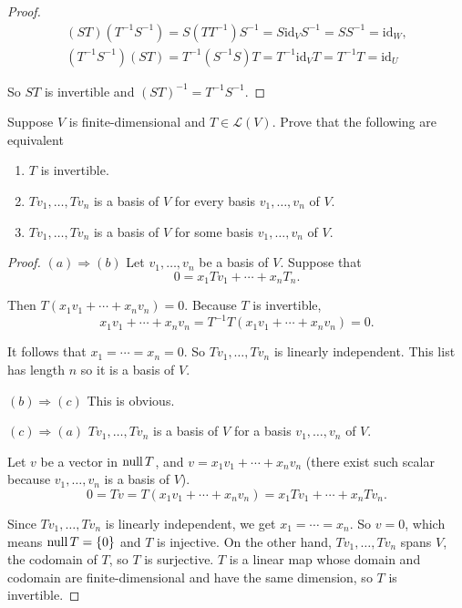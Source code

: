 \begin{proof}
    \[
        \begin{split}
            {(ST)}{(T^{-1}S^{-1})} = S(TT^{-1})S^{-1} = S\text{id}_{V}S^{-1} = SS^{-1} = \text{id}_{W}, \\
            {(T^{-1}S^{-1})(ST)} = T^{-1}(S^{-1}S)T = T^{-1}\text{id}_{V}T = T^{-1}T = \text{id}_{U}
        \end{split}
    \]

    So $ST$ is invertible and ${(ST)}^{-1} = T^{-1}S^{-1}$.
\end{proof}
\newpage

\begin{exercise}\label{chapter3:sectionD:exercise3}
    Suppose $V$ is finite-dimensional and $T \in \mathcal{L}(V)$. Prove that the following are equivalent
    \begin{enumerate}[label={(\alph*)}]
        \item $T$ is invertible.
        \item $Tv_{1}, \ldots, Tv_{n}$ is a basis of $V$ for every basis $v_{1}, \ldots, v_{n}$ of $V$.
        \item $Tv_{1}, \ldots, Tv_{n}$ is a basis of $V$ for some basis $v_{1}, \ldots, v_{n}$ of $V$.
    \end{enumerate}
\end{exercise}

\begin{proof}
    $(a) \Rightarrow (b)$ Let $v_{1}, \ldots, v_{n}$ be a basis of $V$. Suppose that
    \[
        0 = x_{1}Tv_{1} + \cdots + x_{n}T_{n}.
    \]

    Then $T(x_{1}v_{1} + \cdots + x_{n}v_{n}) = 0$. Because $T$ is invertible,
    \[
        x_{1}v_{1} + \cdots + x_{n}v_{n} = T^{-1}T(x_{1}v_{1} + \cdots + x_{n}v_{n}) = 0.
    \]

    It follows that $x_{1} = \cdots = x_{n} = 0$. So $Tv_{1}, \ldots, Tv_{n}$ is linearly independent. This list has length $n$ so it is a basis of $V$.

    $(b) \Rightarrow (c)$ This is obvious.

    $(c) \Rightarrow (a)$ $Tv_{1}, \ldots, Tv_{n}$ is a basis of $V$ for a basis $v_{1}, \ldots, v_{n}$ of $V$.

    Let $v$ be a vector in $\text{null}\,{T}$, and $v = x_{1}v_{1} + \cdots + x_{n}v_{n}$ (there exist such scalar because $v_{1}, \ldots, v_{n}$ is a basis of $V$).
    \[
        0 = Tv = T(x_{1}v_{1} + \cdots + x_{n}v_{n}) = x_{1}Tv_{1} + \cdots + x_{n}Tv_{n}.
    \]

    Since $Tv_{1}, \ldots, Tv_{n}$ is linearly independent, we get $x_{1} = \cdots = x_{n}$. So $v = 0$, which means $\text{null}\,{T} = \{0\}$ and $T$ is injective. On the other hand, $Tv_{1}, \ldots, Tv_{n}$ spans $V$, the codomain of $T$, so $T$ is surjective. $T$ is a linear map whose domain and codomain are finite-dimensional and have the same dimension, so $T$ is invertible.
\end{proof}
\newpage

